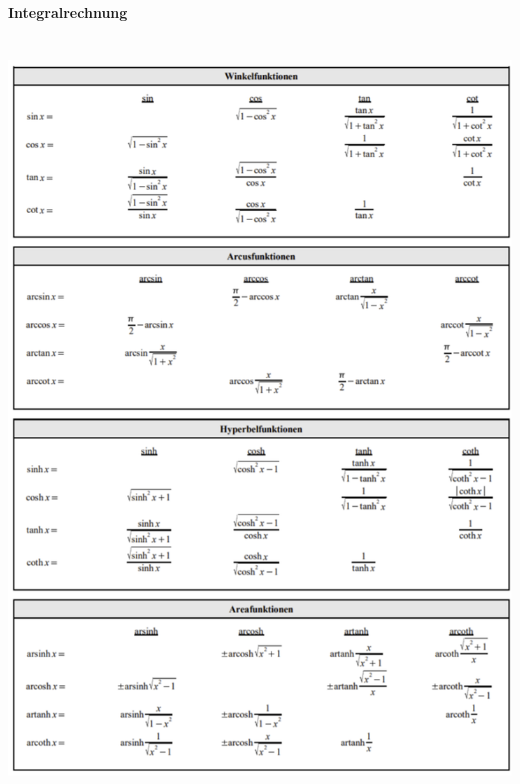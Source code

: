 \paragraph{Integralrechnung}\mbox{}\\
\noindent
\includegraphics[width=\columnwidth]{./images/int.png}
